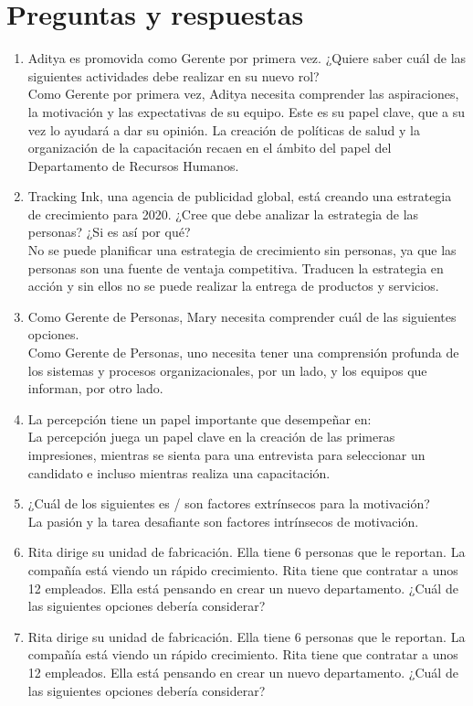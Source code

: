 \documentclass[10pt]{book}
\begin{document}
\section{Preguntas y respuestas}
\begin{enumerate}[\bfseries 1.]
\item Aditya es promovida como Gerente por primera vez. ¿Quiere saber cuál de las siguientes actividades debe realizar en su nuevo rol?\\
Como Gerente por primera vez, Aditya necesita comprender las aspiraciones, la motivación y las expectativas de su equipo. Este es su papel clave, que a su vez lo ayudará a dar su opinión. La creación de políticas de salud y la organización de la capacitación recaen en el ámbito del papel del Departamento de Recursos Humanos.
\item Tracking Ink, una agencia de publicidad global, está creando una estrategia de crecimiento para 2020. ¿Cree que debe analizar la estrategia de las personas? ¿Si es así por qué?\\
No se puede planificar una estrategia de crecimiento sin personas, ya que las personas son una fuente de ventaja competitiva. Traducen la estrategia en acción y sin ellos no se puede realizar la entrega de productos y servicios.
\item Como Gerente de Personas, Mary necesita comprender cuál de las siguientes opciones.\\
Como Gerente de Personas, uno necesita tener una comprensión profunda de los sistemas y procesos organizacionales, por un lado, y los equipos que informan, por otro lado.
\item La percepción tiene un papel importante que desempeñar en:\\
La percepción juega un papel clave en la creación de las primeras impresiones, mientras se sienta para una entrevista para seleccionar un candidato e incluso mientras realiza una capacitación.
\item ¿Cuál de los siguientes es / son factores extrínsecos para la motivación?\\
La pasión y la tarea desafiante son factores intrínsecos de motivación.
\item Rita dirige su unidad de fabricación. Ella tiene 6 personas que le reportan. La compañía está viendo un rápido crecimiento. Rita tiene que contratar a unos 12 empleados. Ella está pensando en crear un nuevo departamento. ¿Cuál de las siguientes opciones debería considerar?
\item Rita dirige su unidad de fabricación. Ella tiene 6 personas que le reportan. La compañía está viendo un rápido crecimiento. Rita tiene que contratar a unos 12 empleados. Ella está pensando en crear un nuevo departamento. ¿Cuál de las siguientes opciones debería considerar?\\

\end{enumerate}
\end{document}
